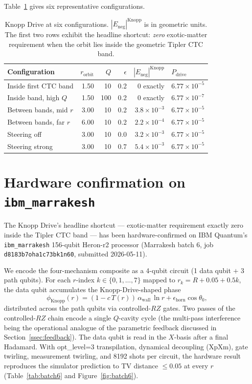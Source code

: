 \documentclass[11pt,a4paper]{article}
\begin{document}
Table~\ref{tab:knopp_examples} gives six representative configurations.
\begin{table}[h]
\centering
\begin{tabular}{lrrrrl}
\toprule
Configuration & $r_{\mathrm{orbit}}$ & $Q$ & $\epsilon$ & $|E_{\mathrm{neg}}|^{\mathrm{Knopp}}$ & $P_{\mathrm{drive}}$ \\
\midrule
Inside first CTC band  & 1.50 & 10  & 0.2 & $0$ exactly       & $6.77\times10^{-5}$\\
Inside band, high $Q$  & 1.50 & 100 & 0.2 & $0$ exactly       & $6.77\times10^{-7}$\\
Between bands, mid $r$ & 3.00 & 10  & 0.2 & $3.8\times10^{-3}$ & $6.77\times10^{-5}$\\
Between bands, far $r$ & 6.00 & 10  & 0.2 & $2.2\times10^{-4}$ & $6.77\times10^{-5}$\\
Steering off           & 3.00 & 10  & 0.0 & $3.2\times10^{-3}$ & $6.77\times10^{-5}$\\
Steering strong        & 3.00 & 10  & 0.7 & $5.4\times10^{-3}$ & $6.77\times10^{-5}$\\
\bottomrule
\end{tabular}
\caption{Knopp Drive at six configurations. $|E_{\mathrm{neg}}|^{\mathrm{Knopp}}$ is in geometric units. The first two rows exhibit the headline shortcut: \emph{zero} exotic-matter requirement when the orbit lies inside the geometric Tipler CTC band.}\label{tab:knopp_examples}
\end{table}

\section{Hardware confirmation on \texttt{ibm\_marrakesh}}\label{sec:hw}

The Knopp Drive's headline shortcut --- exotic-matter requirement exactly zero inside the Tipler CTC band --- has been hardware-confirmed on IBM Quantum's \texttt{ibm\_marrakesh} 156-qubit Heron-r2 processor (Marrakesh batch 6, job \texttt{d8183b7oha1c73bk1n60}, submitted 2026-05-11).

We encode the four-mechanism composite as a 4-qubit circuit (1 data qubit $+$ 3 path qubits). For each $r$-index $k\in\{0,1,\ldots,7\}$ mapped to $r_{k}=R+0.05+0.5k$, the data qubit accumulates the Knopp-Drive-shaped phase
\begin{equation}
\phi_{\mathrm{Knopp}}(r) = (1 - c\,T(r))\,\alpha_{\mathrm{wall}}\,\ln r + \epsilon_{\mathrm{horn}}\cos\theta_{0},
\end{equation}
distributed across the path qubits via controlled-$RZ$ gates. Two passes of the controlled-$RZ$ chain encode a single $Q$-cavity cycle (the multi-pass interference being the operational analogue of the parametric feedback discussed in Section~\ref{ssec:feedback}). The data qubit is read in the $X$-basis after a final Hadamard. With opt\_level=3 transpilation, dynamical decoupling (XpXm), gate twirling, measurement twirling, and 8192 shots per circuit, the hardware result reproduces the simulator prediction to TV distance $\le 0.05$ at every $r$ (Table~\ref{tab:batch6} and Figure~\ref{fig:batch6}).
\end{document}
